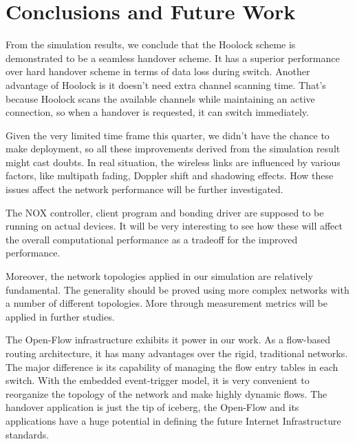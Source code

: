 \section{Conclusions and Future Work}\label{conc}

From the simulation results, we conclude that the Hoolock scheme is demonstrated to be a seamless handover scheme. It has a superior performance over hard handover scheme in terms of data loss during switch. Another advantage of Hoolock is it doesn’t need extra channel scanning time. That’s because Hoolock scans the available channels while maintaining an active connection, so when a handover is requested, it can switch immediately.

Given the very limited time frame this quarter, we didn’t have the chance to make deployment, so all these improvements derived from the simulation result might cast doubts. In real situation, the wireless links are influenced by various factors, like multipath fading, Doppler shift and shadowing effects. How these issues affect the network performance will be further investigated.

The NOX controller, client program and bonding driver are supposed to be running on actual devices. It will be very interesting to see how these will affect the overall computational performance as a tradeoff for the improved performance.

Moreover, the network topologies applied in our simulation are relatively fundamental. The generality should be proved using more complex networks with a number of different topologies. More through measurement metrics will be applied in further studies.

The Open-Flow infrastructure exhibits it power in our work. As a flow-based routing architecture, it has many advantages over the rigid, traditional networks. The major difference is its capability of managing the flow entry tables in each switch. With the embedded event-trigger model, it is very convenient to reorganize the topology of the network and make highly dynamic flows. The handover application is just the tip of iceberg, the Open-Flow and its applications have a huge potential in defining the future Internet Infrastructure standards.
